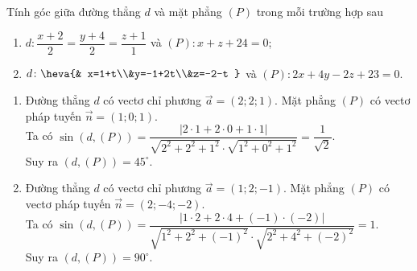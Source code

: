 \begin{bt}%

	Tính góc giữa đường thẳng $d$ và mặt phẳng $(P)$ trong mỗi trường hợp sau
	\begin{enumerate}
		\item $d\colon\dfrac{x+2}{2}=\dfrac{y+4}{2}=\dfrac{z+1}{1}$ và $(P)\colon x+z+24=0$;
		\item $d\colon\heva{& x=1+t\\&y=-1+2t\\&z=-2-t }$ và $(P)\colon 2x+4y-2z+23=0$.
	\end{enumerate}
	\loigiai
	{
		\begin{enumerate}
			\item Đường thẳng $d$ có vectơ chỉ phương $\overrightarrow{a}=(2;2;1)$. Mặt phẳng $(P)$ có vectơ pháp tuyến $\overrightarrow{n}=(1;0;1)$.\\
			Ta có $\sin (d,(P))=\dfrac{\left |2\cdot 1+2\cdot 0+1\cdot 1 \right |}{\sqrt{2^2+2^2+1^2}\cdot\sqrt{1^2+0^2+1^2}}=\dfrac{1}{\sqrt{2}}$.\\
			Suy ra $(d,(P))=45^{\circ}$.
			\item Đường thẳng $d$ có vectơ chỉ phương $\overrightarrow{a}=(1;2;-1)$. Mặt phẳng $(P)$ có vectơ pháp tuyến $\overrightarrow{n}=(2;-4;-2)$.\\
			Ta có $\sin (d,(P))=\dfrac{\left |1\cdot 2+2\cdot 4+(-1)\cdot (-2) \right |}{\sqrt{1^2+2^2+(-1)^2}\cdot\sqrt{2^2+4^2+(-2)^2}}=1$.\\
			Suy ra $(d,(P))=90^{\circ}$.
		\end{enumerate}
	}
\end{bt}

